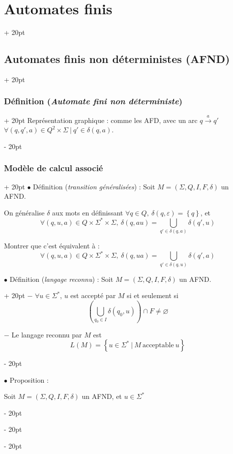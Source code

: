\documentclass[a4paper, 12pt, twoside]{article}
\newcommand{\lr}[1]{\left( #1 \right)}
\newcommand{\set}[1]{\left\{ #1 \right\}}
\newcommand{\ind}[1][20pt]{\advance\leftskip + #1}
\newcommand{\deind}[1][20pt]{\advance\leftskip - #1}
\newenvironment{indt}[2][20pt]{#2 \par \ind[#1]}{\par \deind} %
\begin{document}
\begin{indt}{\section{Automates finis}}
\begin{indt}{\subsection{Automates finis non déterministes (AFND)}}
\begin{indt}{\subsubsection{Définition (\textit{Automate fini non déterministe})}}
                Représentation graphique : comme les AFD, avec un arc $q \overset a \longrightarrow q'$ $\forall (q, q', a) \in Q^2 \times \Sigma\ |\ q' \in \delta(q, a)$.
            \end{indt}

            \vspace{12pt}
            
            \begin{indt}{\subsubsection{Modèle de calcul associé}}
                $\bullet$ Définition (\emph{transition généralisées}) : Soit $M = (\Sigma, Q, I, F, \delta)$ un AFND.

                On généralise $\delta$ aux mots en définissant $\forall q \in Q,\ \delta(q, \varepsilon) = \set q$, et
                \[
                    \forall (q, u, a) \in Q \times \Sigma^* \times \Sigma,\
                    \delta(q, au) = \bigcup_{q' \in \delta(q, a)} \delta(q', u)
                \]

                 Montrer que c'est équivalent à :
                \[
                    \forall (q, u, a) \in Q \times \Sigma^* \times \Sigma,\
                    \delta(q, ua) = \bigcup_{q' \in \delta(q, u)} \delta(q', a)
                \]

                \vspace{12pt}
                
                \begin{indt}{$\bullet$ Définition (\emph{langage reconnu}) : Soit $M = (\Sigma, Q, I, F, \delta)$ un AFND.}
                    $-$ $\forall u \in \Sigma^*$, $u$ est accepté par $M$ si et seulement si
                    \[
                        \lr{\bigcup_{q_0 \in I} \delta(q_0, u)} \cap F \neq \varnothing
                    \]

                    $-$ Le langage reconnu par $M$ est
                    \[
                        L(M) = \set{u \in \Sigma^*\ |\ M\ \text{acceptable}\ u}
                    \]
                \end{indt}

                \vspace{12pt}
                
                $\bullet$ Proposition :
                \begin{emphBox}
                    Soit $M = (\Sigma, Q, I, F, \delta)$ un AFND, et $u \in \Sigma^*$


\end{emphBox}
\end{indt}
\end{indt}
\end{indt}
\end{document}
